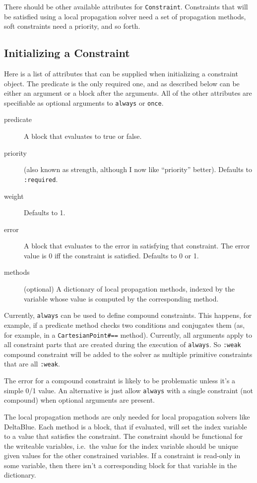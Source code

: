 \documentclass[11pt]{article}
\begin{document}
There should be other available attributes for
\lstinline{Constraint}.  Constraints that will be satisfied
using a local propagation solver need a set of propagation methods,
soft constraints need a priority, and so forth.  

\subsection{Initializing a Constraint}

Here is a list of attributes that can be supplied when initializing a
constraint object.  The predicate is the only required one, and as
described below can be either an argument or a block after the
arguments.  All of the other attributes are specifiable as optional
arguments to \lstinline{always} or \lstinline{once}.

\begin{description}
\item[predicate] A block that evaluates to true or false.  
\item[priority] (also known as strength, although I now like
  ``priority'' better).  Defaults to \lstinline{:required}.
\item[weight] Defaults to 1.
\item[error] A block that evaluates to the error in satisfying that
  constraint.  The error value is 0 iff the constraint is satisfied.
  Defaults to 0 or 1.
\item[methods] (optional) A dictionary of local propagation methods, indexed by
  the variable whose value is computed by the corresponding
  method.
\end{description}

Currently, \lstinline{always} can be used to define compound
constraints. This happens, for example, if a predicate method checks
two conditions and conjugates them (as, for example, in a
\lstinline{CartesianPoint#==} method). Currently, all arguments apply
to all constraint parts that are created during the execution of
\lstinline{always}. So \lstinline{:weak} compound constraint will be
added to the solver as multiple primitive constraints that are all
\lstinline{:weak}.

The error for a compound constraint is likely to be problematic unless
it's a simple 0/1 value. An alternative is just allow
\lstinline{always} with a single constraint (not compound) when
optional arguments are present.

The local propagation methods are only needed for local propagation
solvers like DeltaBlue.  Each method is a block, that if evaluated,
will set the index variable to a value that satisfies the constraint.
The constraint should be functional for the writeable variables, i.e.\
the value for the index variable should be unique given values for the
other constrained variables.  If a constraint is read-only in some
variable, then there isn't a corresponding block for that variable in
the dictionary.
\end{document}
